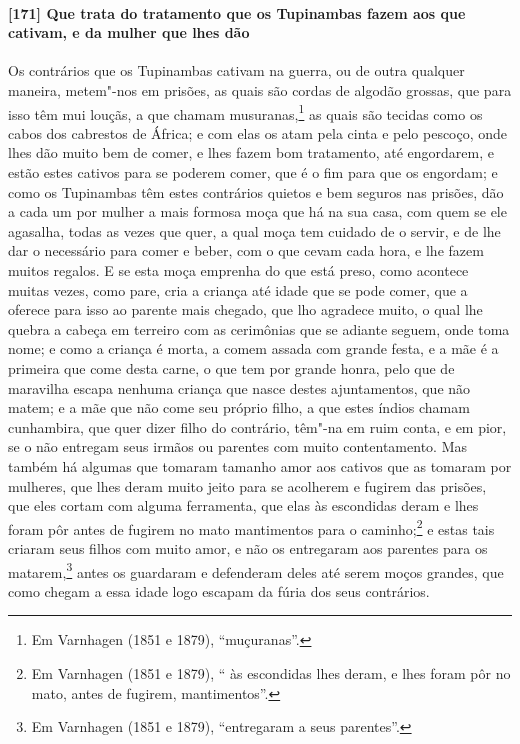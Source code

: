 \paragraph{[171] Que trata do tratamento que os Tupinambas fazem aos que cativam, e da
mulher que lhes dão}\quad
Os contrários que os Tupinambas cativam na guerra, ou de outra qualquer maneira, metem"-nos
em prisões, as quais são cordas de algodão grossas, que para isso têm mui louçãs, a que
chamam musuranas,\footnote{ Em Varnhagen (1851 e 1879), ``muçuranas''.} as quais são
tecidas como os cabos dos cabrestos de África; e com elas os atam pela cinta e pelo
pescoço, onde lhes dão muito bem de comer, e lhes fazem bom tratamento, até engordarem, e
estão estes cativos para se poderem comer, que é o fim para que os engordam; e como os
Tupinambas têm estes contrários quietos e bem seguros nas prisões, dão a cada um por
mulher a mais formosa moça que há na sua casa, com quem se ele agasalha, todas as vezes
que quer, a qual moça tem cuidado de o servir, e de lhe dar o necessário para comer e
beber, com o que cevam cada hora, e lhe fazem muitos regalos. E se esta moça emprenha do
que está preso, como acontece muitas vezes, como pare, cria a criança até idade que se
pode comer, que a oferece para isso ao parente mais chegado, que lho agradece muito, o
qual lhe quebra a cabeça em terreiro com as cerimônias que se adiante seguem, onde toma
nome; e como a criança é morta, a comem assada com grande festa, e a mãe é a primeira que
come desta carne, o que tem por grande honra, pelo que de maravilha escapa nenhuma criança
que nasce destes ajuntamentos, que não matem; e a mãe que não come seu próprio filho, a
que estes índios chamam cunhambira, que quer dizer filho do contrário, têm"-na em ruim
conta, e em pior, se o não entregam seus irmãos ou parentes com muito contentamento. Mas
também há algumas que tomaram tamanho amor aos cativos que as tomaram por mulheres, que
lhes deram muito jeito para se acolherem e fugirem das prisões, que eles cortam com alguma
ferramenta, que elas às escondidas deram e lhes foram pôr antes de fugirem no mato
mantimentos para o caminho;\footnote{ Em Varnhagen (1851 e 1879), `` às escondidas lhes
deram, e lhes foram pôr no mato, antes de fugirem, mantimentos''.} e estas tais criaram
seus filhos com muito amor, e não os entregaram aos parentes para os matarem,\footnote{ Em
Varnhagen (1851 e 1879), ``entregaram a seus parentes''.} antes os guardaram e defenderam
deles até serem moços grandes, que como chegam a essa idade logo escapam da fúria dos seus
contrários.

